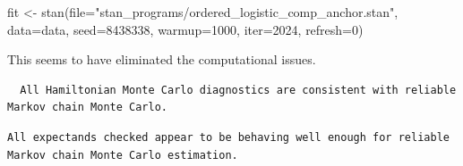 \documentclass[
  letterpaper,
  DIV=11,
  numbers=noendperiod]{scrartcl}
\newenvironment{Shaded}{\begin{snugshade}}{\end{snugshade}}
\newcommand{\AttributeTok}[1]{\textcolor[rgb]{0.40,0.45,0.13}{#1}}
\newcommand{\ConstantTok}[1]{\textcolor[rgb]{0.56,0.35,0.01}{#1}}
\newcommand{\DecValTok}[1]{\textcolor[rgb]{0.68,0.00,0.00}{#1}}
\newcommand{\FunctionTok}[1]{\textcolor[rgb]{0.28,0.35,0.67}{#1}}
\newcommand{\NormalTok}[1]{\textcolor[rgb]{0.00,0.23,0.31}{#1}}
\newcommand{\OtherTok}[1]{\textcolor[rgb]{0.00,0.23,0.31}{#1}}
\newcommand{\SpecialCharTok}[1]{\textcolor[rgb]{0.37,0.37,0.37}{#1}}
\newcommand{\StringTok}[1]{\textcolor[rgb]{0.13,0.47,0.30}{#1}}
\begin{document}
\begin{Shaded}
\begin{Highlighting}[]
\NormalTok{fit }\OtherTok{\textless{}{-}} \FunctionTok{stan}\NormalTok{(}\AttributeTok{file=}\StringTok{"stan\_programs/ordered\_logistic\_comp\_anchor.stan"}\NormalTok{,}
            \AttributeTok{data=}\NormalTok{data, }\AttributeTok{seed=}\DecValTok{8438338}\NormalTok{,}
            \AttributeTok{warmup=}\DecValTok{1000}\NormalTok{, }\AttributeTok{iter=}\DecValTok{2024}\NormalTok{, }\AttributeTok{refresh=}\DecValTok{0}\NormalTok{)}
\end{Highlighting}
\end{Shaded}

This seems to have eliminated the computational issues.

\begin{Shaded}
\end{Shaded}

\begin{verbatim}
  All Hamiltonian Monte Carlo diagnostics are consistent with reliable
Markov chain Monte Carlo.
\end{verbatim}

\begin{Shaded}
\end{Shaded}

\begin{verbatim}
All expectands checked appear to be behaving well enough for reliable
Markov chain Monte Carlo estimation.
\end{verbatim}
\end{document}
